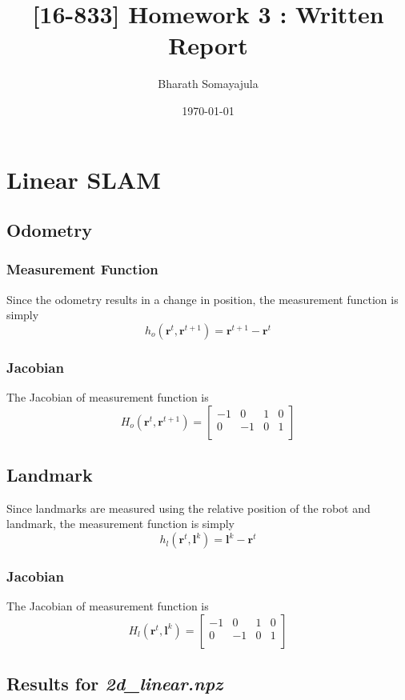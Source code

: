 \documentclass[12pt, a4paper]{article}
\title{[16-833] Homework 3 : Written Report}
\author{Bharath Somayajula}
\date{\today}
\begin{document}
\maketitle

\tableofcontents
\section{Linear SLAM}
\subsection{Odometry}
\subsubsection{Measurement Function}
Since the odometry results in a change in position, the measurement function is simply
\[h_o(\mathbf{r}^t, \mathbf{r}^{t+1}) = \mathbf{r}^{t+1} - \mathbf{r}^t\]
\subsubsection{Jacobian}
The Jacobian of measurement function is
\[H_o(\mathbf{r}^t, \mathbf{r}^{t+1}) = \begin{bmatrix}
  -1 & 0 & 1 & 0\\
  0 & -1 & 0 & 1\\
\end{bmatrix}\]
\subsection{Landmark}
Since landmarks are measured using the relative position of the robot and landmark, the measurement function is simply
\[h_l(\mathbf{r}^t, \mathbf{l}^{k}) = \mathbf{l}^{k} - \mathbf{r}^t\]
\subsubsection{Jacobian}
The Jacobian of measurement function is
\[H_l(\mathbf{r}^t, \mathbf{l}^{k}) = \begin{bmatrix}
  -1 & 0 & 1 & 0\\
  0 & -1 & 0 & 1\\
\end{bmatrix}\]
\subsection{Results for \textit{2d\_linear.npz}}
\end{document}
